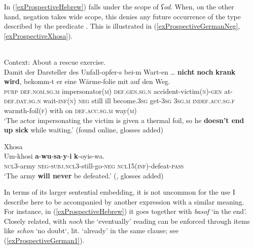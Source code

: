 In (\ref{exProspectiveHebrew})  falls under the scope of \textit{ʕod}. When, on the other hand, negation takes wide scope, this denies any future occurrence of the type described by the predicate \parencite{Loebner1989}. This is illustrated in (\ref{exProspectiveGermanNeg}, \ref{exProspectiveXhosa}).

\begin{exe}
	\ex {} \label{exProspectiveGermanNeg}\\
	Context: About a rescue exercise.\\
	\gll Damit der Darsteller des Unfall-opfer-s bei-m Wart-en … \textbf{nicht} \textbf{noch} \textbf{krank} \textbf{wird}, bekomm-t er eine Wärme-folie mit auf den Weg.	\\
	\textsc{purp} \textsc{def}.\textsc{nom}.\textsc{sg}.\textsc{m} impersonator(\textsc{m}) \textsc{def}.\textsc{gen}.\textsc{sg}.\textsc{n} accident-victim(\textsc{n})-\textsc{gen} at-\textsc{def}.\textsc{dat}.\textsc{sg}.\textsc{n} wait-\textsc{inf}(\textsc{n}) {}
	 \textsc{neg} still ill become.3\textsc{sg} get-3\textsc{sg} 3\textsc{sg}.\textsc{m} \textsc{indef}.\textsc{acc}.\textsc{sg}.\textsc{f} warmth-foil(\textsc{f}) with on \textsc{def}.\textsc{acc}.\textsc{sg}.\textsc{m} way(\textsc{m})\\
	\glt \lq The actor impersonating the victim is given a thermal foil, so he \textbf{doesn't end up sick} while waiting.\rq{ }(found online, glosses added)%
	
	\ex Xhosa\label{exProspectiveXhosa}\\
	\gll Um-khosi \textbf{a}-\textbf{wu}-\textbf{sa}-\textbf{y}-\textbf{i} \textbf{k}-oyis-wa.\\
	\textsc{ncl}3-army \textsc{neg}-\textsc{subj}.\textsc{ncl}3-still-go-\textsc{neg} \textsc{ncl}15(\textsc{inf})-defeat-\textsc{pass}\\
	\glt \lq The army \textbf{will never} be defeated.\rq{ }(\cite[132]{McLaren1936}, glosses added)
\end{exe}

In terms of its larger sentential embedding, it is not uncommon for the use I describe here to be accompanied by another expression with a similar meaning. For instance, in (\ref{exProspectiveHebrew}) it goes together with \textit{basof} \lq in the end\rq{}. Closely related, with  \textit{noch} the \lq eventually\rq{ }reading can be enforced through items like \textit{schon} \lq no doubt\lq{}, lit. \lq{}already\rq{ }in the same clause; see (\ref{exProspectiveGerman1}).


